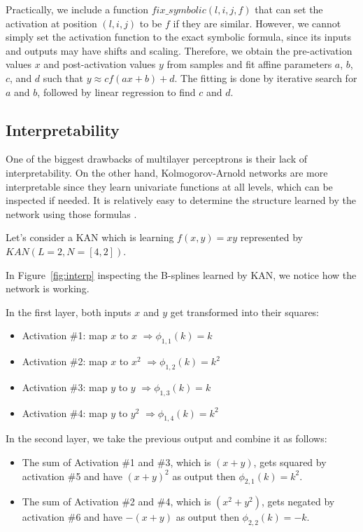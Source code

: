 Practically, we include a function $fix\_symbolic(l,i,j,f)$ that can set the activation at position $(l, i, j)$ to be $f$ if they are similar. 
However, we cannot simply set the activation function to the exact symbolic formula, since its inputs and outputs may have shifts and scaling. 
Therefore, we obtain the pre-activation values $x$ and post-activation values $y$ from samples and fit affine parameters $a$, $b$, $c$, and $d$ such that $y \approx c f(a x + b) + d$. The fitting is done by iterative search for $a$ and $b$, followed by linear regression to find $c$ and $d$. 

\subsection{Interpretability}
\label{sec:interpre}
One of the biggest drawbacks of multilayer perceptrons is their lack of interpretability. On the other hand, Kolmogorov-Arnold networks are more interpretable since they learn univariate functions at all levels, which can be inspected if needed. It is relatively easy to determine the structure learned by the network using those formulas \cite{kan_intro}.

Let's consider a KAN which is learning $f(x,y)=xy$ represented by $KAN(L=2,N=[4, 2])$.

In Figure~\ref{fig:interp} inspecting the B-splines learned by KAN, we notice how the network is working.

In the first layer, both inputs $x$ and $y$ get transformed into their squares:
\begin{itemize}
    \item Activation \#1: map $x$ to $x$ $\Rightarrow \phi_{1,1}(k) = k $ 
    \item Activation \#2: map $x$ to $x^2$ $\Rightarrow \phi_{1,2}(k) = k^2$ 
    \item Activation \#3: map $y$ to $y$ $\Rightarrow \phi_{1,3}(k) = k$ 
    \item Activation \#4: map $y$ to $y^2$ $\Rightarrow \phi_{1,4}(k) = k^2$ 
\end{itemize}

In the second layer, we take the previous output and combine it as follows:
\begin{itemize}
    \item The sum of Activation \#1 and \#3, which is $(x+y)$, gets squared by activation \#5 and have $(x+y)^2$ as output then $\phi_{2,1}(k) = k^2$.

    \item The sum of Activation \#2 and \#4, which is $(x^2+y^2)$, gets negated by activation \#6 and have $-(x+y)$ as output then $\phi_{2,2}(k) = -k$.
\end{itemize}

